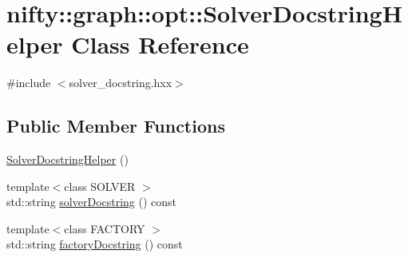 \hypertarget{classnifty_1_1graph_1_1opt_1_1SolverDocstringHelper}{}\section{nifty\+:\+:graph\+:\+:opt\+:\+:Solver\+Docstring\+Helper Class Reference}
\label{classnifty_1_1graph_1_1opt_1_1SolverDocstringHelper}


{\ttfamily \#include $<$solver\+\_\+docstring.\+hxx$>$}

\subsection*{Public Member Functions}
\begin{DoxyCompactItemize}
\item 
\hyperlink{classnifty_1_1graph_1_1opt_1_1SolverDocstringHelper_ad65febde001f75a34ac7265c7b91ee95}{Solver\+Docstring\+Helper} ()
\item 
{\footnotesize template$<$class S\+O\+L\+V\+ER $>$ }\\std\+::string \hyperlink{classnifty_1_1graph_1_1opt_1_1SolverDocstringHelper_ae3a523ec9203bcf75c2b113e24cc7fa8}{solver\+Docstring} () const
\item 
{\footnotesize template$<$class F\+A\+C\+T\+O\+RY $>$ }\\std\+::string \hyperlink{classnifty_1_1graph_1_1opt_1_1SolverDocstringHelper_a28204b766744c321f49f32270319d182}{factory\+Docstring} () const
\end{DoxyCompactItemize}
